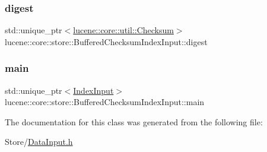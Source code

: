 \subsubsection{\texorpdfstring{digest}{digest}}
{\footnotesize\ttfamily std\+::unique\+\_\+ptr$<$\mbox{\hyperlink{classlucene_1_1core_1_1util_1_1Checksum}{lucene\+::core\+::util\+::\+Checksum}}$>$ lucene\+::core\+::store\+::\+Buffered\+Checksum\+Index\+Input\+::digest\hspace{0.3cm}{\ttfamily [private]}}

\mbox{\label{classlucene_1_1core_1_1store_1_1BufferedChecksumIndexInput_ab57fb18272b384d6cb10c59408103e0f}} 
\subsubsection{\texorpdfstring{main}{main}}
{\footnotesize\ttfamily std\+::unique\+\_\+ptr$<$\mbox{\hyperlink{classlucene_1_1core_1_1store_1_1IndexInput}{Index\+Input}}$>$ lucene\+::core\+::store\+::\+Buffered\+Checksum\+Index\+Input\+::main\hspace{0.3cm}{\ttfamily [private]}}



The documentation for this class was generated from the following file\+:\begin{DoxyCompactItemize}
\item 
Store/\mbox{\hyperlink{DataInput_8h}{Data\+Input.\+h}}\end{DoxyCompactItemize}
